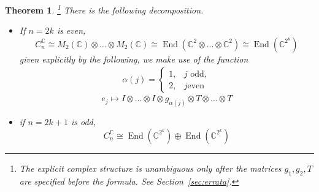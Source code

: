 \documentclass[12pt]{article}
\theoremstyle{plain}
\newtheorem{thm}{Theorem}[subsection] %
\theoremstyle{definition}
\newcommand{\bb}[1]{\mathbb{#1}}
\begin{document}
\begin{thm}\label{thm:structure_clifford}\footnote{The explicit complex structure is unambiguous only after the matrices $g_1, g_2, T$ are specified before the formula. See Section~\ref{sec:errata}.}
There is the following decomposition.
\begin{itemize}
\item If $n = 2k$ is even,
\begin{equation}
C_n^{\bb{C}} \cong M_2(\bb{C}) \otimes \hdots \otimes M_2(\bb{C}) \cong \operatorname{End}(\bb{C}^2 \otimes \hdots \otimes \bb{C}^2) \cong \operatorname{End}(\bb{C}^{2^k})
\end{equation}
given explicitly by the following, we make use of the function
\begin{align*}
\alpha(j) = \begin{cases}
1,& j\text{ odd},\\
2, & j\text{even}
\end{cases}
\end{align*}
\begin{equation}
e_j \longmapsto I \otimes \hdots \otimes I \otimes g_{\alpha(j)} \otimes T \otimes \hdots \otimes T
\end{equation}
\item if $n = 2k+1$ is odd,
\begin{equation}
C_n^{\bb{C}} \cong \operatorname{End}(\bb{C}^{2^k}) \oplus \operatorname{End}(\bb{C}^{2^k})
\end{equation}
\end{itemize}
\end{thm}
\end{document}
